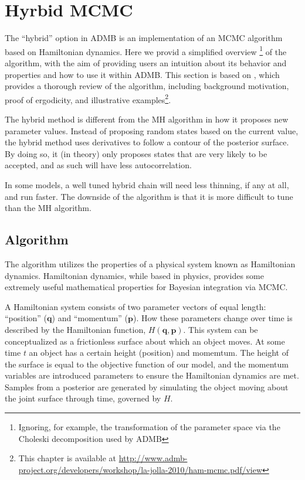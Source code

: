 \documentclass{article}\usepackage[]{graphicx}\usepackage[]{color}
\begin{document}
\section{Hyrbid MCMC}\label{sec:hybrid}
The ``hybrid'' option in ADMB is an implementation of an
MCMC algorithm based on Hamiltonian dynamics. Here we provid
a simplified overview \footnote{Ignoring, for example, the
  transformation of the parameter space via the Choleski
  decomposition used by ADMB} of the algorithm, with the aim
of providing users an intuition about its behavior and
properties and how to use it within ADMB. This section is
based on \cite{brooks2011}, which provides a thorough review
of the algorithm, including background motivation, proof of
ergodicity, and illustrative examples\footnote{This chapter
  is available at
  \url{http://www.admb-project.org/developers/workshop/la-jolla-2010/ham-mcmc.pdf/view}}.

The hybrid method is different from the MH algorithm in how
it proposes new parameter values. Instead of proposing
random states based on the current value, the hybrid method
uses derivatives to follow a contour of the posterior
surface. By doing so, it (in theory) only proposes states
that are very likely to be accepted, and as such will have
less autocorrelation.

In some models, a well tuned hybrid chain will need less
thinning, if any at all, and run faster. The downside of the
algorithm is that it is more difficult to tune than the MH
algorithm.

\subsection{Algorithm}
The algorithm utilizes the properties of a physical system
known as Hamiltonian dynamics. Hamiltonian dynamics, while
based in physics, provides some extremely useful
mathematical properties for Bayesian integration via MCMC.

A Hamiltonian system consists of two parameter vectors of
equal length: ``position'' ($\mathbf{q}$) and ``momentum''
($\mathbf{p}$). How these parameters change over time is
described by the Hamiltonian function,
$H(\mathbf{q},\mathbf{p})$. This system can be
conceptualized as a frictionless surface about which an
object moves. At some time $t$ an object has a certain
height (position) and momemtum. The height of the surface is
equal to the objective function of our model, and the
momentum variables are introduced parameters to ensure the
Hamiltonian dynamics are met. Samples from a posterior are
generated by simulating the object moving about the joint
surface through time, governed by $H$.
\end{document}
